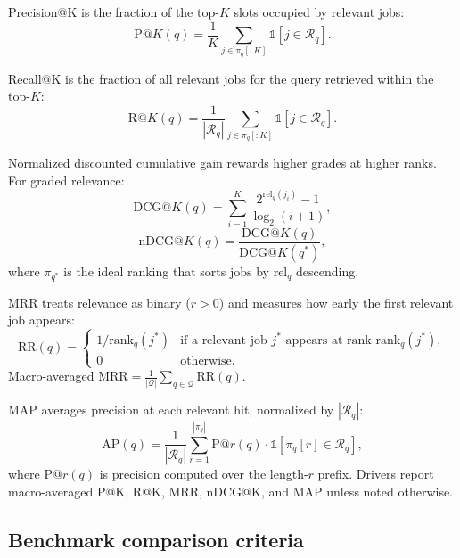 Precision@K is the fraction of the top-$K$ slots occupied by relevant jobs:
\begin{equation}
  \mathrm{P@}K(q) = \frac{1}{K}\sum_{j \in \pi_q[:K]} \mathbb{1}[j \in \mathcal{R}_q].
  \label{eq:p-at-k}
\end{equation}

Recall@K is the fraction of all relevant jobs for the query retrieved within the top-$K$:
\begin{equation}
  \mathrm{R@}K(q) = \frac{1}{|\mathcal{R}_q|}\sum_{j \in \pi_q[:K]} \mathbb{1}[j \in \mathcal{R}_q].
  \label{eq:r-at-k}
\end{equation}

Normalized discounted cumulative gain rewards higher grades at higher ranks.
For graded relevance:
\begin{equation}
  \mathrm{DCG@}K(q) = \sum_{i=1}^{K} \frac{2^{\mathrm{rel}_q(j_i)} - 1}{\log_2(i+1)},
  \label{eq:dcg}
\end{equation}
\begin{equation}
  \mathrm{nDCG@}K(q) = \frac{\mathrm{DCG@}K(q)}{\mathrm{DCG@}K(q^\ast)},
  \label{eq:ndcg}
\end{equation}
where $\pi_{q^\ast}$ is the ideal ranking that sorts jobs by $\mathrm{rel}_q$ descending.

MRR treats relevance as binary ($r>0$) and measures how early the first relevant job appears:
\begin{equation}
  \mathrm{RR}(q) =
    \begin{cases}
      1 / \mathrm{rank}_q(j^\ast) & \text{if a relevant job } j^\ast \text{ appears at rank } \mathrm{rank}_q(j^\ast),\\
      0 & \text{otherwise}.
    \end{cases}
  \label{eq:mrr}
\end{equation}
Macro-averaged $\mathrm{MRR} = \frac{1}{|\mathcal{Q}|}\sum_{q \in \mathcal{Q}} \mathrm{RR}(q)$.

MAP averages precision at each relevant hit, normalized by $|\mathcal{R}_q|$:
\begin{equation}
  \mathrm{AP}(q) = \frac{1}{|\mathcal{R}_q|}
    \sum_{r=1}^{|\pi_q|}
    \mathrm{P@}r(q) \cdot \mathbb{1}[\pi_q[r] \in \mathcal{R}_q],
  \label{eq:map}
\end{equation}
where $\mathrm{P@}r(q)$ is precision computed over the length-$r$ prefix.
Drivers report macro-averaged P@K, R@K, MRR, nDCG@K, and MAP unless noted otherwise.

\subsection{Benchmark comparison criteria}\label{sec:5-benchmark-criteria}

